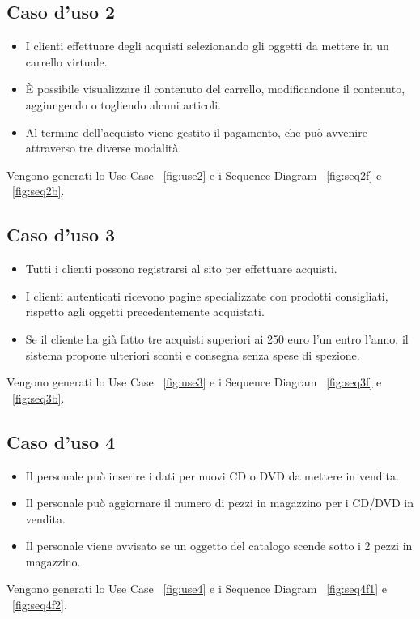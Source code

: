 \documentclass[a4paper,titlepage]{book}
\begin{document}
\subsection{Caso d'uso 2}
\begin{itemize}
\item I clienti effettuare degli acquisti selezionando gli oggetti da mettere in un carrello virtuale.
\item \`E possibile visualizzare il contenuto del carrello, modificandone il contenuto, aggiungendo o togliendo alcuni articoli.
\item Al termine dell'acquisto viene gestito il pagamento, che pu\`o avvenire attraverso tre diverse modalit\`a.
\end{itemize}
Vengono generati lo Use Case \figurename~\ref{fig:use2} e i Sequence Diagram \figurename~\ref{fig:seq2f} e \figurename~\ref{fig:seq2b}.

\subsection{Caso d'uso 3}
\begin{itemize}
\item Tutti i clienti possono registrarsi al sito per effettuare acquisti.
\item I clienti autenticati ricevono pagine specializzate con prodotti consigliati, rispetto agli oggetti precedentemente acquistati.
\item Se il cliente ha gi\`a fatto tre acquisti superiori ai 250 euro l'un entro l'anno, il sistema propone ulteriori sconti e consegna senza spese di spezione.
\end{itemize}
Vengono generati lo Use Case \figurename~\ref{fig:use3} e i Sequence Diagram \figurename~\ref{fig:seq3f} e \figurename~\ref{fig:seq3b}.

\subsection{Caso d'uso 4}
\begin{itemize}
\item Il personale pu\`o inserire i dati per nuovi CD o DVD da mettere in vendita.
\item Il personale pu\`o aggiornare il numero di pezzi in magazzino per i CD/DVD in vendita.
\item Il personale viene avvisato se un oggetto del catalogo scende sotto i 2 pezzi in magazzino.
\end{itemize}
Vengono generati lo Use Case \figurename~\ref{fig:use4} e i Sequence Diagram \figurename~\ref{fig:seq4f1} e \figurename~\ref{fig:seq4f2}.
\end{document}
